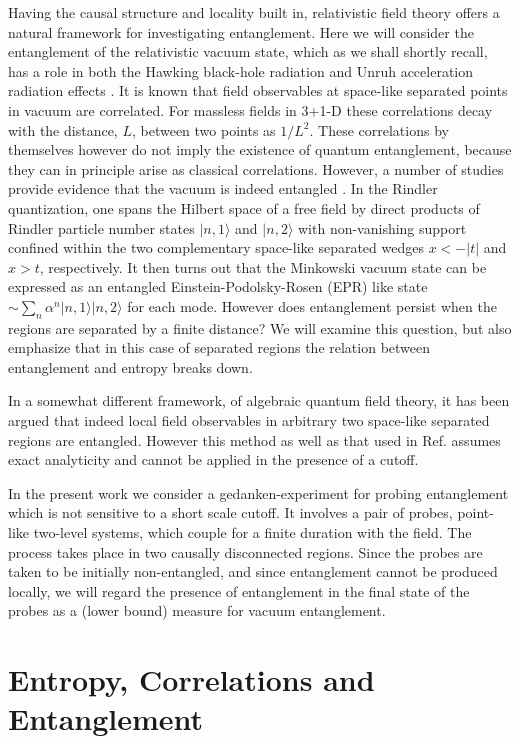 \documentclass[12pt]{article}
\def \ra {\rangle}
\begin{document}
Having the causal structure and locality built in,
relativistic field theory offers a natural framework for
investigating
entanglement.
Here we will consider the
entanglement of the relativistic vacuum state, which as we shall
shortly recall, has a role in both the Hawking black-hole
radiation
\cite{hawking}
and  Unruh acceleration radiation effects \cite{unruh}.
It is known that field observables at space-like separated points
in vacuum are correlated.
For massless fields in 3+1-D these correlations decay
with the distance,  $L$, between two points as $ 1/L^{2}$.
These correlations by themselves however do not imply
the existence of quantum entanglement, because
they can in principle arise as classical correlations.
However, a number of studies provide evidence that
the vacuum is indeed entangled \cite{unruh,werner,clifton}.
In the Rindler quantization,
one spans the Hilbert space of a free field by direct products
of Rindler particle number states  $|n,1\ra$ and $|n,2\ra$
with non-vanishing support confined within
the two complementary space-like separated wedges $x<-|t|$ and
$x>t$,
respectively.
It then turns out \cite{unruh}
that the Minkowski vacuum state
can be expressed as an entangled Einstein-Podolsky-Rosen (EPR)
like state
 $\sim \sum_n \alpha^n
|n,1\ra|n,2\ra$ for each mode.
However does entanglement persist when the regions
are separated by a finite distance? We will examine this
question,
but also emphasize that in this case of separated regions the
relation
between entanglement and entropy breaks down.

In a somewhat different framework, of algebraic quantum
field theory, it has been argued  \cite{clifton}
that indeed local field observables in arbitrary two space-like
separated regions are entangled.
However this method as well as that used in Ref. \cite{unruh}
assumes exact
analyticity and cannot be applied in the presence of a cutoff.

In the present work we consider a gedanken-experiment
for probing entanglement which is not sensitive to a short scale
cutoff. It involves a pair of probes, point-like two-level
systems,
which couple for a finite duration with the field.
The process takes place in two causally disconnected
regions. Since the probes are taken to be initially
non-entangled, and since
entanglement cannot be produced locally,
we will regard the presence of  entanglement in the final state of
the probes as a (lower bound)
measure for vacuum entanglement.



\section{\bf Entropy, Correlations and Entanglement}
\end{document}
